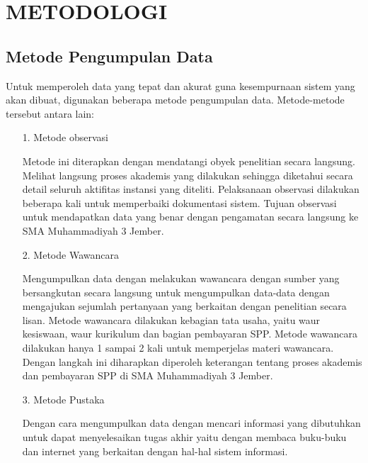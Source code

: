 \documentclass{jtetiproposalskripsi}
\begin{document}
\chapter{METODOLOGI}

\section{Metode Pengumpulan Data}
Untuk  memperoleh  data  yang  tepat  dan  akurat  guna  kesempurnaan  sistem yang akan dibuat, digunakan beberapa metode pengumpulan data. Metode-metode tersebut antara lain:


\begin{itemize}
\item[1.]Metode observasi

Metode ini diterapkan dengan mendatangi obyek  penelitian  secara langsung.  Melihat  langsung  proses  akademis  yang  dilakukan  sehingga diketahui  secara  detail  seluruh  aktifitas  instansi  yang  diteliti.  Pelaksanaan observasi  dilakukan  beberapa  kali  untuk  memperbaiki  dokumentasi  sistem. Tujuan  observasi  untuk  mendapatkan  data  yang  benar  dengan  pengamatan secara langsung ke SMA Muhammadiyah 3 Jember.
\item[2.]Metode Wawancara

Mengumpulkan data dengan melakukan wawancara dengan sumber yang bersangkutan  secara  langsung  untuk  mengumpulkan  data-data  dengan mengajukan  sejumlah  pertanyaan  yang  berkaitan  dengan  penelitian  secara lisan.  Metode wawancara  dilakukan  kebagian  tata  usaha,   yaitu  waur 
kesiswaan,  waur kurikulum dan bagian pembayaran SPP. Metode wawancara dilakukan  hanya  1  sampai  2  kali  untuk  memperjelas  materi  wawancara. Dengan langkah ini diharapkan diperoleh  keterangan tentang proses akademis 
dan pembayaran SPP di SMA Muhammadiyah 3 Jember.
\item[3.]Metode Pustaka

Dengan  cara  mengumpulkan  data  dengan  mencari  informasi  yang dibutuhkan  untuk  dapat  menyelesaikan  tugas  akhir  yaitu  dengan  membaca buku-buku dan internet yang berkaitan dengan hal-hal sistem informasi.
\end{itemize}
\end{document}
